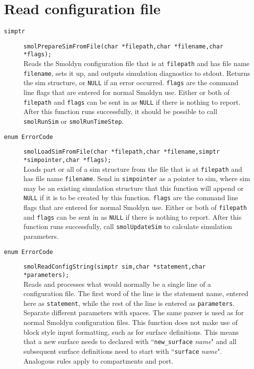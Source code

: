 \documentclass {book}
\begin{document}
\section{Read configuration file}

\begin{description}

\item[\texttt{simptr}]
\texttt{smolPrepareSimFromFile(char *filepath,char *filename,char *flags);}
\hfill \\
Reads the Smoldyn configuration file that is at \texttt{filepath} and has file name \texttt{filename}, sets it up, and outputs simulation diagnostics to stdout. Returns the sim structure, or \texttt{NULL} if an error occurred. \texttt{flags} are the command line flags that are entered for normal Smoldyn use. Either or both of \texttt{filepath} and \texttt{flags} can be sent in as \texttt{NULL} if there is nothing to report. After this function runs successfully, it should be possible to call \texttt{smolRunSim} or \texttt{smolRunTimeStep}.

\item[\texttt{enum ErrorCode}]
\texttt{smolLoadSimFromFile(char *filepath,char *filename,simptr *simpointer,char *flags);}
\hfill \\
Loads part or all of a sim structure from the file that is at \texttt{filepath} and has file name \texttt{filename}. Send in \texttt{simpointer} as a pointer to sim, where sim may be an existing simulation structure that this function will append or \texttt{NULL} if it is to be created by this function. \texttt{flags} are the command line flags that are entered for normal Smoldyn use. Either or both of \texttt{filepath} and \texttt{flags} can be sent in as \texttt{NULL} if there is nothing to report. After this function runs successfully, call \texttt{smolUpdateSim} to calculate simulation parameters.

\item[\texttt{enum ErrorCode}]
\texttt{smolReadConfigString(simptr sim,char *statement,char *parameters);}
\hfill \\
Reads and processes what would normally be a single line of a configuration file. The first word of the line is the statement name, entered here as \texttt{statement}, while the rest of the line is entered as \texttt{parameters}. Separate different parameters with spaces. The same parser is used as for normal Smoldyn configuration files. This function does not make use of block style input formatting, such as for surface definitions. This means that a new surface needs to declared with ``\texttt{new\_surface} \emph{name}" and all subsequent surface definitions need to start with ``\texttt{surface} \emph{name}". Analogous rules apply to compartments and port.

\end{description}
\end{document}
